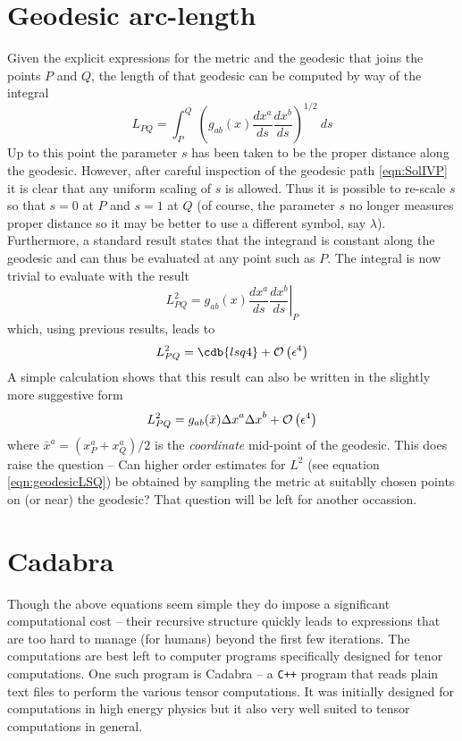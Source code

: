\documentclass[a4paper,12pt]{article}
\numberwithin{equation}{section}
\begin{document}
\section{Geodesic arc-length}\label{sec:ArcLength}

Given the explicit expressions for the metric and the geodesic that joins the points $P$ and
$Q$, the length of that geodesic can be computed by way of the integral
\[
L_{PQ} = \int_P^Q\>\left(g_{ab}(x)\frac{dx^a}{ds}\frac{dx^b}{ds}\right)^{1/2}\>ds
\]
Up to this point the parameter $s$ has been taken to be the proper distance along the
geodesic. However, after careful inspection of the geodesic path \eqref{eqn:SolIVP} it is
clear that any uniform scaling of $s$ is allowed. Thus it is possible to re-scale $s$ so
that $s=0$ at $P$ and $s=1$ at $Q$ (of course, the parameter $s$ no longer measures proper
distance so it may be better to use a different symbol, say $\lambda$). Furthermore, a
standard result states that the integrand is constant along the geodesic and can thus be
evaluated at any point such as $P$. The integral is now trivial to evaluate with the result
\[
L^2_{PQ} = \left.g_{ab}(x)\frac{dx^a}{ds}\frac{dx^b}{ds}\right\vert_{P}
\]
which, using previous results, leads to
%
\begin{dmath*}L^2_{PQ} = \cdb{lsq4} + \BigO{\eps^4}\end{dmath*}
%
A simple calculation shows that this result can also be written in the slightly more
suggestive form
\[
L^2_{PQ} = g_{ab}(\bar x) {\Delta x}^a {\Delta x}^b + \mathcal{O}\left(\epsilon^4\right)
\]
where ${\bar x}^a = (x^a_P+x^a_Q)/2$ is the \emph{coordinate} mid-point of the geodesic.
This does raise the question -- Can higher order estimates for $L^2$ (see equation
\ref{eqn:geodesicLSQ}) be obtained by sampling the metric at suitablly chosen points on
(or near) the geodesic? That question will be left for another occassion.

\section{Cadabra}\label{sec:Cadabra}

Though the above equations seem simple they do impose a significant computational cost --
their recursive structure quickly leads to expressions that are too hard to manage (for
humans) beyond the first few iterations. The computations are best left to computer programs
specifically designed for tenor computations. One such program is Cadabra -- a {\tt C++}
program that reads plain text files to perform the various tensor computations. It was
initially designed for computations in high energy physics but it also very well suited to
tensor computations in general.
\end{document}
